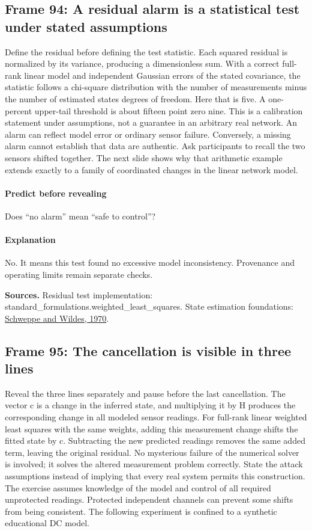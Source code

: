 \documentclass[11pt]{article}
\begin{document}
\subsection*{Frame 94: A residual alarm is a statistical test under stated assumptions}
Define the residual before defining the test statistic. Each squared residual is normalized by its variance, producing a dimensionless sum. With a correct full-rank linear model and independent Gaussian errors of the stated covariance, the statistic follows a chi-square distribution with the number of measurements minus the number of estimated states degrees of freedom. Here that is five. A one-percent upper-tail threshold is about fifteen point zero nine. This is a calibration statement under assumptions, not a guarantee in an arbitrary real network. An alarm can reflect model error or ordinary sensor failure. Conversely, a missing alarm cannot establish that data are authentic. Ask participants to recall the two sensors shifted together. The next slide shows why that arithmetic example extends exactly to a family of coordinated changes in the linear network model.\par
\paragraph{Predict before revealing}Does ``no alarm'' mean ``safe to control''?
\paragraph{Explanation}No. It means this test found no excessive model inconsistency. Provenance and operating limits remain separate checks.
\par\nopagebreak\begin{minipage}{\linewidth}{\footnotesize\color{slate}\textbf{Sources.} Residual test implementation: standard\_formulations.weighted\_least\_squares. State estimation foundations: \href{https://doi.org/10.1109/TPAS.1970.292678}{Schweppe and Wildes, 1970}.\par}\end{minipage}\par\medskip
\subsection*{Frame 95: The cancellation is visible in three lines}
Reveal the three lines separately and pause before the last cancellation. The vector c is a change in the inferred state, and multiplying it by H produces the corresponding change in all modeled sensor readings. For full-rank linear weighted least squares with the same weights, adding this measurement change shifts the fitted state by c. Subtracting the new predicted readings removes the same added term, leaving the original residual. No mysterious failure of the numerical solver is involved; it solves the altered measurement problem correctly. State the attack assumptions instead of implying that every real system permits this construction. The exercise assumes knowledge of the model and control of all required unprotected readings. Protected independent channels can prevent some shifts from being consistent. The following experiment is confined to a synthetic educational DC model.\par
\end{document}
